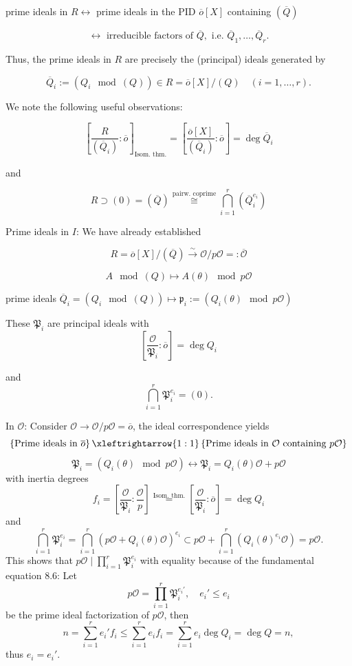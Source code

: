 prime ideals in \( R \leftrightarrow \) prime ideals in the PID \( \overline{o}[X] \) containing \( (\overline{Q}) \)

\[
\leftrightarrow \text{ irreducible factors of } \overline{Q}, \text{ i.e. } \overline{Q}_1, \ldots, \overline{Q}_r.
\]

Thus, the prime ideals in \( R \) are precisely the (principal) ideals generated by 

\[
\overline{Q}_i := (Q_i \mod (Q)) \in R = \overline{o}[X]/(Q) \quad (i = 1, \ldots, r).
\]

We note the following useful observations:

\[
\left[ \frac{R}{(\overline{Q}_i)} : \overline{o} \right]_{\text{Isom. thm.}} = \left[ \frac{\overline{o}[X]}{(\overline{Q}_i)} : \overline{o} \right] = \deg \overline{Q}_i \tag{*}
\]

and 

\[
R \supset (0) = (\overline{Q}) \overset{\text{pairw. coprime}}{\cong} \bigcap_{i=1}^{r} (\overline{Q}_i^{e_i}) \tag{**}
\]

Prime ideals in \(I\): We have already established

\[
R = \overline{o}[X]/(\overline{Q}) \xrightarrow{\sim} \mathcal{O}/p\mathcal{O} =: \overline{\mathcal{O}}
\]

\[
A \mod (Q) \longmapsto A(\theta) \mod p\mathcal{O}
\]

prime ideals \( \overline{Q}_i = (Q_i \mod (Q)) \longmapsto \mathfrak{p}_i := (Q_i(\theta) \mod p\mathcal{O}) 
\)

These \(\mathfrak{P}_i\) are principal ideals with
\[
\left[\frac{\mathcal{O}}{\mathfrak{P}_i} : \overline{o}\right] = \deg Q_i \tag{*}
\]

and 
\[
\bigcap_{i=1}^{r} \mathfrak{P}_i^{e_i} = (0). \tag{**}
\]

In \(\mathcal{O}\): Consider \(\mathcal{O} \longrightarrow \mathcal{O}/p\mathcal{O} = \overline{o}\), the ideal correspondence yields
\[
\left\{ \text{Prime ideals in } \overline{o} \right\} \xleftrightarrow{1:1} \left\{ \text{Prime ideals in } \mathcal{O} \text{ containing } p\mathcal{O} \right\}
\]
\[
\mathfrak{P}_i = (Q_i(\theta) \mod p\mathcal{O}) \longleftrightarrow \mathfrak{P}_i = Q_i(\theta)\mathcal{O} + p\mathcal{O}
\]
with inertia degrees
\[
f_i = \left[\frac{\mathcal{O}}{\mathfrak{P}_i} : \frac{\mathcal{O}}{p} \right] \overset{\text{Isom. thm.}}{=} \left[\frac{\mathcal{O}}{\mathfrak{P}_i} : \overline{o} \right] = \deg Q_i
\]
and 
\[
\bigcap_{i=1}^{r} \mathfrak{P}_i^{e_i} = \bigcap_{i=1}^{r} (p\mathcal{O} + Q_i(\theta)\mathcal{O})^{e_i} \subset p\mathcal{O} + \bigcap_{i=1}^{r} (Q_i(\theta)^{e_i}\mathcal{O}) = p\mathcal{O}.
\]
This shows that \( p\mathcal{O} \mid \prod_{i=1}^{r} \mathfrak{P}_i^{e_i} \) with equality because of the fundamental equation 8.6: Let 
\[
p\mathcal{O} = \prod_{i=1}^{r} \mathfrak{P}_i^{e_i'}, \quad e_i' \leq e_i
\]
be the prime ideal factorization of \( p\mathcal{O} \), then
\[
n = \sum_{i=1}^{r} e_i'f_i \leq \sum_{i=1}^{r} e_if_i = \sum_{i=1}^{r} e_i \deg Q_i = \deg Q = n,
\]
thus \( e_i = e_i' \).



